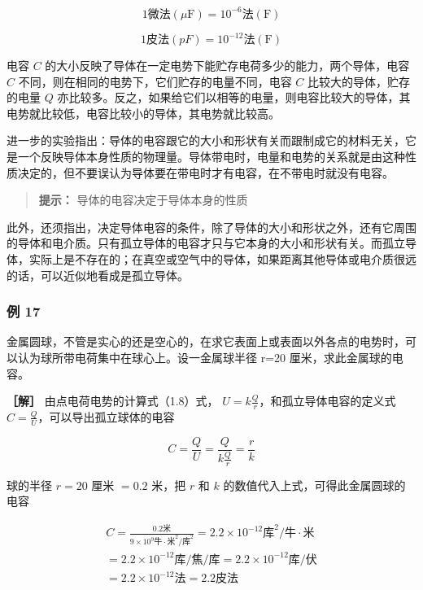 \[
1 \text{微法} (\mu \mathrm{F}) = 10^{-6} \text{法} (\mathrm{F})
\]

\[
1 \text{皮法} (pF) = 10^{- 12} \text{法} (\mathrm{F})
\]

电容 \(C\)
的大小反映了导体在一定电势下能贮存电荷多少的能力，两个导体，电容 \(C\)
不同，则在相同的电势下，它们贮存的电量不同，电容 \(C\)
比较大的导体，贮存的电量 \(Q\)
亦比较多。反之，如果给它们以相等的电量，则电容比较大的导体，其电势就比较低，电容比较小的导体，其电势就比较高。

进一步的实验指出：导体的电容跟它的大小和形状有关而跟制成它的材料无关，它是一个反映导体本身性质的物理量。导体带电时，电量和电势的关系就是由这种性质决定的，但不要误认为导体要在带电时才有电容，在不带电时就没有电容。

\begin{quote}
\textbf{提示：} 导体的电容决定于导体本身的性质
\end{quote}

此外，还须指出，决定导体电容的条件，除了导体的大小和形状之外，还有它周围的导体和电介质。只有孤立导体的电容才只与它本身的大小和形状有关。而孤立导体，实际上是不存在的；在真空或空气中的导体，如果距离其他导体或电介质很远的话，可以近似地看成是孤立导体。

\subsubsection{例 17}\label{ux4f8b-17}

金属圆球，不管是实心的还是空心的，在求它表面上或表面以外各点的电势时，可以认为球所带电荷集中在球心上。设一金属球半径
r=20 厘米，求此金属球的电容。

\textbf{［解］} 由点电荷电势的计算式（1.8）式，
\(U = k \frac{Q}{r}\)，和孤立导体电容的定义式
\(C = \frac{Q}{U}\)，可以导出孤立球体的电容

\[
C = \frac{Q}{U} = \frac{Q}{k \frac{Q}{r}} = \frac{r}{k}
\]

球的半径 \(r = 20\) 厘米 \(= 0.2\) 米，把 \(r\) 和 \(k\)
的数值代入上式，可得此金属圆球的电容

\[
\begin{array}{l} C = \frac{0.2 \text{米}}{9 \times 10^{9} \text{牛} \cdot \text{米}^{2} / \text{库}^{2}} = 2.2 \times 10^{- 12} \text{库}^{2} / \text{牛} \cdot \text{米} \\ = 2.2 \times 10^{- 12} \text{库} / \text{焦} / \text{库} = 2.2 \times 10^{- 12} \text{库} / \text{伏} \\ = 2.2 \times 10^{- 12} \text{法} = 2.2 \text{皮法} \\ \end{array}
\]

